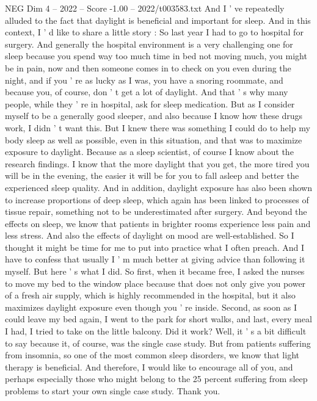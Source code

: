 \begin{textsample}{NEG Dim 4 – 2022 – Score -1.00 – 2022/t003583.txt}
And I ' ve repeatedly alluded to the fact that daylight is beneficial and important for sleep.
And in this context, I ' d like to share a little story : So last year I had to go to hospital for surgery.
And generally the hospital environment is a very challenging one for sleep because you spend way too much time in bed not moving much, you might be in pain, now and then someone comes in to check on you even during the night, and if you ' re as lucky as I was, you have a snoring roommate, and because you, of course, don ' t get a lot of daylight.
And that ' s why many people, while they ' re in hospital, ask for sleep medication.
But as I consider myself to be a generally good sleeper, and also because I know how these drugs work, I didn ' t want this.
But I knew there was something I could do to help my body sleep as well as possible, even in this situation, and that was to maximize exposure to daylight.
Because as a sleep scientist, of course I know about the research findings.
I know that the more daylight that you get, the more tired you will be in the evening, the easier it will be for you to fall asleep and better the experienced sleep quality.
And in addition, daylight exposure has also been shown to increase proportions of deep sleep, which again has been linked to processes of tissue repair, something not to be underestimated after surgery.
And beyond the effects on sleep, we know that patients in brighter rooms experience less pain and less stress.
And also the effects of daylight on mood are well-established.
So I thought it might be time for me to put into practice what I often preach.
And I have to confess that usually I ' m much better at giving advice than following it myself.
But here ' s what I did.
So first, when it became free, I asked the nurses to move my bed to the window place because that does not only give you power of a fresh air supply, which is highly recommended in the hospital, but it also maximizes daylight exposure even though you ' re inside.
Second, as soon as I could leave my bed again, I went to the park for short walks, and last, every meal I had, I tried to take on the little balcony.
Did it work?
Well, it ' s a bit difficult to say because it, of course, was the single case study.
But from patients suffering from insomnia, so one of the most common sleep disorders, we know that light therapy is beneficial.
And therefore, I would like to encourage all of you, and perhaps especially those who might belong to the 25 percent suffering from sleep problems to start your own single case study.
Thank you.

\end{textsample}
